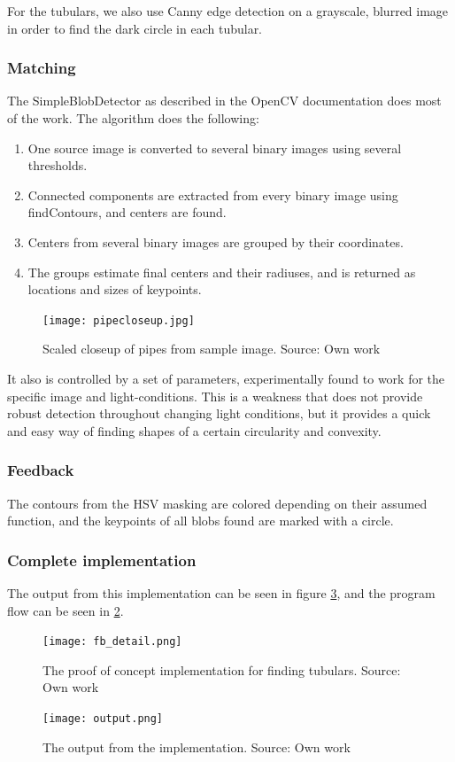 For the tubulars, we also use Canny edge detection on a grayscale, blurred image in order to find the dark circle in each tubular.

\subsubsection{Matching}
The SimpleBlobDetector as described in the OpenCV documentation \citet{opencvdocs15} does most of the work. The algorithm does the following:

\begin{enumerate}
\item[1] One source image is converted to several binary images using several thresholds.
\item[2] Connected components are extracted from every binary image using findContours, and centers are found.
\item[3] Centers from several binary images are grouped by their coordinates.
\item[4] The groups estimate final centers and their radiuses, and is returned as locations and sizes of keypoints.
\end{enumerate}

\begin{figure}[ht]
    \centering
    \texttt{[image: pipecloseup.jpg]}
    \caption{Scaled closeup of pipes from sample image. Source: Own work}
    \label{fig:fb_detail}
\end{figure}
\FloatBarrier

It also is controlled by a set of parameters, experimentally found to work for the specific image and light-conditions. This is a weakness that does not provide robust detection throughout changing light conditions, but it provides a quick and easy way of finding shapes of a certain circularity and convexity.

\subsubsection{Feedback}
The contours from the HSV masking are colored depending on their assumed function, and the keypoints of all blobs found are marked with a circle.

\subsubsection{Complete implementation}
The output from this implementation can be seen in figure \ref{fig:output}, and the program flow can be seen in \ref{fig:fb_detail}.

\begin{figure}[ht]
    \centering
    \texttt{[image: fb\_detail.png]}
    \caption{The proof of concept implementation for finding tubulars. Source: Own work}
    \label{fig:fb_detail}
\end{figure}
\FloatBarrier

\begin{figure}[ht]
    \centering
    \texttt{[image: output.png]}
    \caption{The output from the implementation. Source: Own work}
    \label{fig:output}
\end{figure}
\FloatBarrier